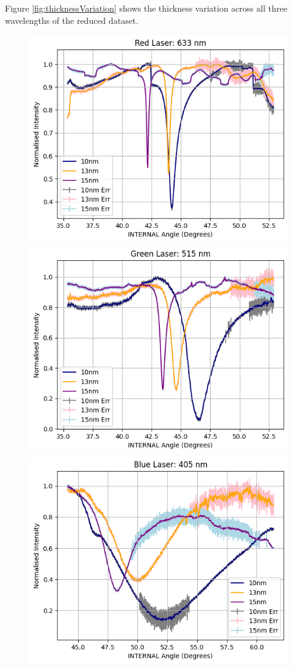 \documentclass[%
reprint,
amsmath,amssymb,
aps,
]{revtex4-2}
\begin{document}
			Figure \ref{fig:thicknessVariation} shows the thickness variation across all three wavelengths of the reduced dataset.
			
			\begin{figure}
				\includegraphics[width=0.85\columnwidth]{redThicknessVariation.png}
				\includegraphics[width=0.85\columnwidth]{greenThicknessVariation.png}
				\includegraphics[width=0.85\columnwidth]{blueThicknessVariation.png}

\end{figure}
\end{document}
